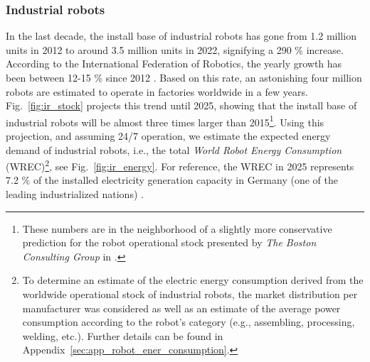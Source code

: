 \subsubsection{Industrial robots}
In the last decade, the install base of industrial robots has gone from 1.2 million units in 2012 to around 3.5 million units in 2022, signifying a 290 \% increase. According to the International Federation of Robotics, the yearly growth has been between 12-15 \% since 2012 \cite{IFR2019}. Based on this rate, an astonishing four million robots are estimated to operate in factories worldwide in a few years. Fig.~\ref{fig:ir_stock} projects this trend until 2025, showing that the install base of industrial robots will be almost three times larger than 2015\footnote{These numbers are in the neighborhood of a slightly more conservative prediction for the robot operational stock presented by \textit{The Boston Consulting Group} in \cite{sirkin2015}.}. Using this projection, and assuming 24/7 operation, we estimate the expected energy demand of industrial robots, i.e., the total \textit{World Robot Energy Consumption} (WREC)\footnote{To determine an estimate of the electric energy consumption derived from the worldwide operational stock of industrial robots, the market distribution per manufacturer was considered as well as an estimate of the average power consumption according to the robot's category (e.g., assembling, processing, welding, etc.). Further details can be found in Appendix~\ref{sec:app_robot_ener_consumption}.}, see Fig.~\ref{fig:ir_energy}. For reference, the WREC in 2025 represents 7.2 \% of the installed electricity generation capacity in Germany (one of the leading industrialized nations) \cite{fraunhofer2016}. 

